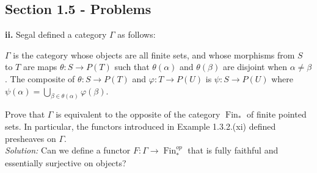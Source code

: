 \documentclass[a4paper]{article}
\theoremstyle{plain}%
\theoremstyle{definition}
\theoremstyle{remark}
\DeclareMathOperator{\Fin}{Fin}
\begin{document}
\subsection*{Section 1.5 - Problems}
\textbf{ii.} Segal defined a category $\Gamma$ as follows:
\begin{center}
    $\Gamma$ is the category whose objects are all finite sets, and whose
    morphisms from $S$ to $T$ are maps $\theta  \colon S \to P(T)$ such that
    $\theta (\alpha)$ and $\theta (\beta)$ are disjoint when
    $\alpha \neq \beta$. The composite of $\theta  \colon S \to P(T)$ and
    $\varphi  \colon T \to P(U)$ is $\psi  \colon S \to P(U)$ where
    $\psi (\alpha) = \bigcup_{\beta \in \theta(\alpha)} \varphi(\beta)$.
\end{center}
Prove that $\Gamma$ is equivalent to the opposite of the category $\Fin_*$ of
finite pointed sets. In particular, the functors introduced in Example
1.3.2.(xi) defined presheaves on $\Gamma$.\\
\linebreak
\textit{Solution:} Can we define a functor 
$F  \colon \Gamma \to \Fin_*^{op}$ that is fully faithful and essentially
surjective on objects?\\
\linebreak
\end{document}
